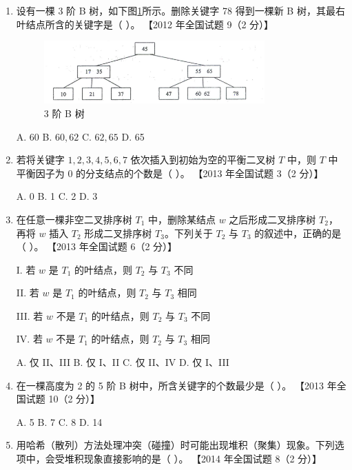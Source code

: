 \documentclass[lang=cn,newtx,10pt,scheme=chinese]{../../elegantbook}
\begin{document}
\begin{enumerate}
    \item 设有一棵 3 阶 B 树，如下图\ref{fig:9-18}所示。删除关键字 78 得到一棵新 B 树，其最右叶结点所含的关键字是（ ）。  
    【2012 年全国试题 9（2 分）】  

    \begin{figure}[h!]
        \centering
        \includegraphics[width=0.8\textwidth]{../../figure/exercisePicPDF/chapter9/9-18.pdf}
        \caption{3 阶 B 树}
        \label{fig:9-18}
    \end{figure}

    A. 60 \quad B. $60, 62$ \quad C. $62, 65$ \quad D. 65  

    \item 若将关键字 $1, 2, 3, 4, 5, 6, 7$ 依次插入到初始为空的平衡二叉树 $T$ 中，则 $T$ 中平衡因子为 0 的分支结点的个数是（ ）。  
    【2013 年全国试题 3（2 分）】 

    A. 0 \quad B. 1 \quad C. 2 \quad D. 3  

    \item 在任意一棵非空二叉排序树 $T_1$ 中，删除某结点 $w$ 之后形成二叉排序树 $T_2$，再将 $w$ 插入 $T_2$ 形成二叉排序树 $T_3$。下列关于 $T_2$ 与 $T_3$ 的叙述中，正确的是（ ）。  
    【2013 年全国试题 6（2 分）】  

    I. 若 $w$ 是 $T_1$ 的叶结点，则 $T_2$ 与 $T_3$ 不同 

    II. 若 $w$ 是 $T_1$ 的叶结点，则 $T_2$ 与 $T_3$ 相同  

    III. 若 $w$ 不是 $T_1$ 的叶结点，则 $T_2$ 与 $T_3$ 不同 

    IV. 若 $w$ 不是 $T_1$ 的叶结点，则 $T_2$ 与 $T_3$ 相同  

    A. 仅 II、III \quad B. 仅 I、II \quad C. 仅 II、IV \quad D. 仅 I、III  

    \item 在一棵高度为 2 的 5 阶 B 树中，所含关键字的个数最少是（ ）。  
    【2013 年全国试题 10（2 分）】  

    A. 5 \quad B. 7 \quad C. 8 \quad D. 14  

    \item 用哈希（散列）方法处理冲突（碰撞）时可能出现堆积（聚集）现象。下列选项中，会受堆积现象直接影响的是（ ）。  
    【2014 年全国试题 8（2 分）】  


\end{enumerate}
\end{document}
